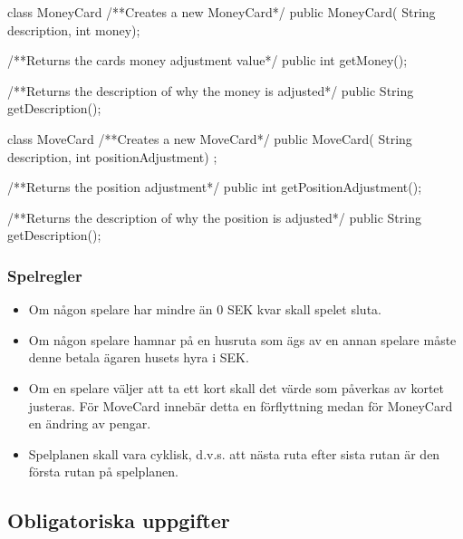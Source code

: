 \begin{JavaSpec}{class MoneyCard}
    /**Creates a new MoneyCard*/
    public MoneyCard( String description, int money);

    /**Returns the cards money adjustment value*/
    public int getMoney();

    /**Returns the description of why the money is adjusted*/ 
    public String getDescription();
\end{JavaSpec}

\begin{JavaSpec}{class MoveCard}
    /**Creates a new MoveCard*/
    public MoveCard( String description, int positionAdjustment) ;

    /**Returns the position adjustment*/
    public int getPositionAdjustment();

    /**Returns the description of why the position is adjusted*/
    public String getDescription();

\end{JavaSpec}

\subsubsection{Spelregler}

\begin{itemize}
\item Om någon spelare har mindre än 0 SEK kvar skall spelet sluta.
\item Om någon spelare hamnar på en husruta som ägs av en annan spelare måste denne betala ägaren husets hyra i SEK.
\item Om en spelare väljer att ta ett kort skall det värde som påverkas av kortet justeras. För MoveCard innebär detta en förflyttning medan för MoneyCard en ändring av pengar.
\item Spelplanen skall vara cyklisk, d.v.s. att nästa ruta efter sista rutan är den första rutan på spelplanen.
\end{itemize}



\subsection{Obligatoriska uppgifter}

